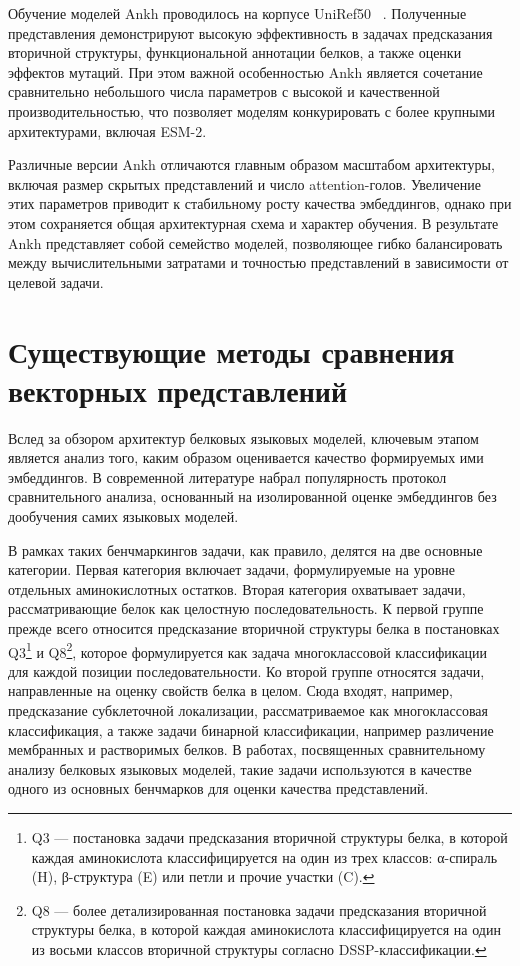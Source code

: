 \documentclass[specification,annotation,times]{itmo-student-thesis}
\begin{document}
Обучение моделей Ankh проводилось на корпусе UniRef50 ~\cite{suzek2007uniref}. Полученные представления демонстрируют высокую эффективность в задачах предсказания вторичной структуры, функциональной аннотации белков, а также оценки эффектов мутаций. При этом важной особенностью Ankh является сочетание сравнительно небольшого числа параметров с высокой и качественной производительностью, что позволяет моделям конкурировать с более крупными архитектурами, включая ESM-2.

Различные версии Ankh отличаются главным образом масштабом архитектуры, включая размер скрытых представлений и число attention-голов. Увеличение этих параметров приводит к стабильному росту качества эмбеддингов, однако при этом сохраняется общая архитектурная схема и характер обучения. В результате Ankh представляет собой семейство моделей, позволяющее гибко балансировать между вычислительными затратами и точностью представлений в зависимости от целевой задачи.

\section{Существующие методы сравнения векторных представлений}

Вслед за обзором архитектур белковых языковых моделей, ключевым этапом является анализ того, каким образом оценивается качество формируемых ими эмбеддингов. В современной литературе набрал популярность протокол сравнительного анализа, основанный на изолированной оценке эмбеддингов без дообучения самих языковых моделей.

В рамках таких бенчмаркингов задачи, как правило, делятся на две основные категории. Первая категория включает задачи, формулируемые на уровне отдельных аминокислотных остатков. Вторая категория охватывает задачи, рассматривающие белок как целостную последовательность.
К первой группе прежде всего относится предсказание вторичной структуры белка в постановках Q3\footnote{Q3 — постановка задачи предсказания вторичной структуры белка, в которой каждая аминокислота классифицируется на один из трех классов: α-спираль (H), β-структура (E) или петли и прочие участки (C).} и Q8\footnote{Q8 — более детализированная постановка задачи предсказания вторичной структуры белка, в которой каждая аминокислота классифицируется на один из восьми классов вторичной структуры согласно DSSP-классификации.}, которое формулируется как задача многоклассовой классификации для каждой позиции последовательности. Ко второй группе относятся задачи, направленные на оценку свойств белка в целом. Сюда входят, например, предсказание субклеточной локализации, рассматриваемое как многоклассовая классификация, а также задачи бинарной классификации, например различение мембранных и растворимых белков.
В работах, посвященных сравнительному анализу белковых языковых моделей, такие задачи используются в качестве одного из основных бенчмарков для оценки качества представлений.
\end{document}
